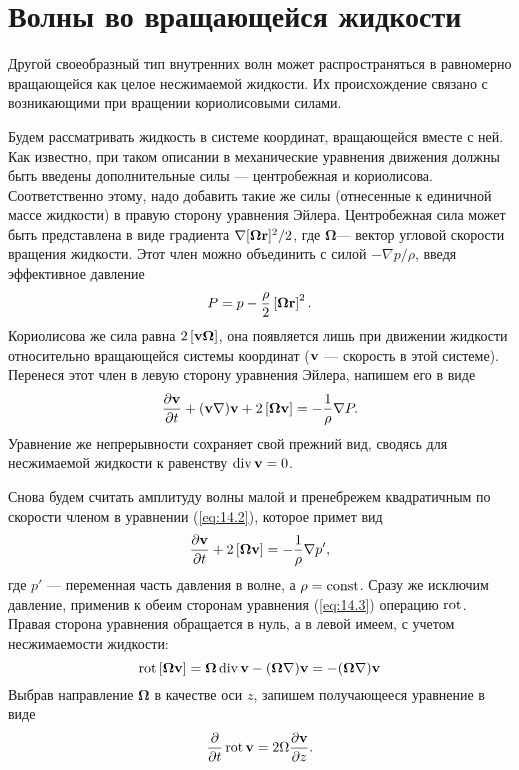 \section{Волны во вращающейся жидкости}
\label{sec:p14}

Другой своеобразный тип внутренних волн может распространяться в равномерно
вращающейся как целое несжимаемой жидкости. Их происхождение связано с
возникающими при вращении кориолисовыми силами.

Будем рассматривать жидкость в системе координат, вращающейся вместе с ней. Как
известно, при таком описании в механические уравнения движения должны быть
введены дополнительные силы — центробежная и кориолисова. Соответственно этому,
надо добавить такие же силы (отнесенные к единичной массе жидкости) в правую
сторону уравнения Эйлера. Центробежная сила может быть представлена в виде
градиента $\nabla\lbrack\bm{\Omega}\mathbf{r}\rbrack^2/2$, где $\bm\Omega$—
вектор угловой скорости вращения жидкости. Этот член можно объединить с силой
$-\nabla p/\rho$, введя эффективное давление
\begin{equation}
   \label{eq:14.1}
   P = p - \frac{\rho}{2}\left\lbrack \bm\Omega\mathbf{r} \right\rbrack^2.
\end{equation}
Кориолисова же сила равна $2\left\lbrack { \mathbf{v} }\bm\Omega \right\rbrack$, она
появляется лишь при движении жидкости относительно вращающейся системы координат
(${\mathbf{v}}$ — скорость в этой системе). Перенеся этот член в левую сторону уравнения
Эйлера, напишем его в виде
\begin{equation}
   \label{eq:14.2}
   \frac{\partial{{ \mathbf{v} }}}{\partial{t}} + ({\mathbf{v}} \nabla) {\mathbf{v}} + 2\left\lbrack\bm\Omega{ \mathbf{v} }\right\rbrack =
   - \frac1{\rho}\nabla P.
\end{equation}
Уравнение же непрерывности сохраняет свой прежний вид, сводясь для несжимаемой
жидкости к равенству $\mathop{\mathrm{div}}\nolimits{ \mathbf{v} } = 0$.

Снова будем считать амплитуду волны малой и пренебрежем квадратичным по скорости
членом в уравнении (\ref{eq:14.2}), которое примет вид
\begin{equation}
   \label{eq:14.3}
   \frac{\partial{{ \mathbf{v} }}}{\partial{t}}+ 2\left\lbrack \bm\Omega{ \mathbf{v} } \right\rbrack =
   - \frac1{\rho}\nabla p',
\end{equation}
где $p'$ — переменная часть давления в волне, а $\rho = \mathop{\mathrm{const}}\nolimits$. Сразу же
исключим давление, применив к обеим сторонам уравнения (\ref{eq:14.3}) операцию $\mathop{\mathrm{rot}}\nolimits$.
Правая сторона уравнения обращается в нуль, а в левой имеем, с учетом
несжимаемости жидкости:
\[
   \mathop{\mathrm{rot}}\nolimits \left\lbrack \bm\Omega{ \mathbf{v} } \right\rbrack =
   \bm\Omega\mathop{\mathrm{div}}\nolimits{ \mathbf{v} } - (\bm\Omega\nabla){\mathbf{v}} =
   - (\bm\Omega\nabla){\mathbf{v}}
\]
Выбрав направление $\bm\Omega$ в качестве оси $z$, запишем получающееся
уравнение в виде
\begin{equation}
   \label{eq:14.4}
   \frac{\partial}{\partial t}\mathop{\mathrm{rot}}\nolimits{ \mathbf{v} } = 2\Omega \frac{\partial{{ \mathbf{v} }}}{\partial{z}}.
\end{equation}

